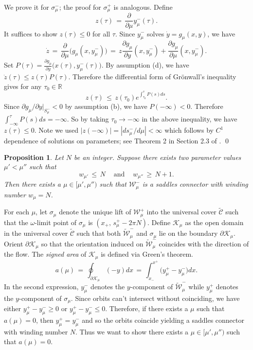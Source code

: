 \documentclass[11 pt]{article}
\newtheorem{prop}[thm]{Proposition}%
\renewcommand\({\left(}
\renewcommand\){\right)}
\newcommand\wt{\widetilde}
\newcommand\s{\sigma}
\newcommand\<{\langle}
\renewcommand\>{\rangle}
\newcommand\8{\infty}
\newcommand{\R}{\mathbb R}
\newcommand{\pd}{\partial}
\newcommand{\mc}{\mathcal}
\begin{document}
\proof
We prove it for $\s^-_\mu$; the proof for $\s^+_\mu$ is analogous.  Define
\[
z(\tau) \,=\, \frac{\pd}{\pd \mu}y^-_\mu(\tau).
\]
It suffices to show $z(\tau) \leq 0$ for all $\tau$. Since $y^-_\mu$ solves $\dot{y} = g_\mu(x,y)$, we have 
\[
\dot{z} \,=\, \frac{\pd}{\pd \mu}\big(g_\mu(x, y^-_\mu)\big) \,=\, z\frac{\pd g_\mu}{\pd y}(x, y^-_\mu) + \frac{\pd g_\mu}{\pd \mu}(x, y^-_\mu). 
\]
Set $P(\tau) = \frac{\pd g_\mu}{\pd y}\big(x(\tau), y^-_\mu(\tau)\big)$. By assumption (d), we have $\dot{z}(\tau) \leq z(\tau)P(\tau)$. Therefore the differential form of Gr{\"o}nwall's inequality gives for any $\tau_0 \in \R$
\[
z(\tau) \,\leq\, z(\tau_0)e^{\int_{\tau_0}^\tau P(s)ds}.
\]
Since $\pd g_{\mu}/\pd y |_{S^-_\mu} < 0$ by assumption (b), we have $P(-\infty) < 0$. Therefore $\int_{-\infty}^\tau P(s) ds = -\infty$. So by taking $\tau_0 \to -\infty$ in the above inequality, we have $z(\tau) \leq 0$. Note we used $|z(-\infty)| = |ds_\mu^-/d\mu| < \infty$ which follows by $C^1$ dependence of solutions on parameters; see Theorem 2 in Section 2.3 of \cite{Perko}.
\qed




\medskip
\medskip

\begin{prop}\label{saddles conn prop}
Let $N$ be an integer. Suppose there exists two parameter values $\mu' < \mu''$ such that 
\[
w_{\mu'} \,\leq\, N \:\:\:\: \text{ and } \:\:\:\: w_{\mu''} \,\geq\, N + 1.
\]
 Then there exists a  $\mu \in [\mu', \mu'')$ such that $\mc{W}^-_\mu$ is a saddles connector with winding number $w_\mu = N$. 

\end{prop}

\proof
For each $\mu$, let $\sigma_\mu$ denote the unique lift of $\mc{W}^+_\mu$ into the universal cover $\wt{\mc{C}}$ such that the $\omega$-limit point of $\sigma_\mu$ is $(x_+,\, s^+_\mu-2\pi N)$. Define $\mc{K}_\mu$ as the open domain in the universal cover $\wt{\mc{C}}$ such that both $\wt{\mc{W}}^-_\mu$ and $\sigma_\mu$ lie on the boundary $\pd\mc{K}_\mu$. Orient $\pd\mc{K}_\mu$ so that the orientation induced on $\wt{\mc{W}}^-_\mu$ coincides with the direction of the flow. The \emph{signed area} of $\mc{K}_\mu$ is defined via Green's theorem.
\[
a(\mu) \,=\, \oint_{\pd\mc{K}_\mu}(-y)dx \,=\, \int_{x_-}^{x^+}\big(y^+_\mu - y_\mu^-\big)dx.
\]
In the second expression, $y_\mu^-$ denotes the $y$-component of $\wt{\mc{W}}^-_\mu$ while $y_\mu^+$ denotes the $y$-component of $\s_\mu$. Since orbits can't intersect without coinciding, we have either $y^+_\mu - y^-_\mu \geq 0$ or $y^+_\mu - y^-_\mu \leq 0$. Therefore, if there exists a $\mu$ such that $a(\mu) = 0$, then $y^+_\mu = y^-_\mu$ and so the orbits coincide yielding a saddles connector with winding number $N$. Thus we want to show there exists a $\mu \in [\mu', \mu'')$ such that $a(\mu) = 0$. 
\end{document}
